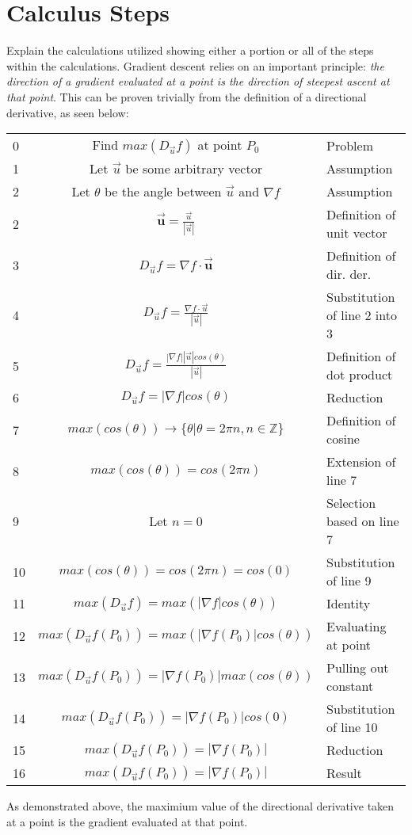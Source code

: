 \documentclass[11pt, a4paper]{article}
\newcommand\fvec[1]{\vec{\textbf{#1}}}
\begin{document}
\section{Calculus Steps}
Explain the calculations utilized showing either a portion or all of the steps within the calculations.
Gradient descent relies on an important principle: \textit{the direction of a gradient evaluated at a 
point is the direction of steepest ascent at that point}. This can be proven trivially from the definition
of a directional derivative, as seen below:
\begin{center}
    \begin{tabular}{l | c | l}
        0 & Find $max(D_{\vec{u}}f)$ at point $P_0$ & Problem\\
        1 & Let $\vec{u}$ be some arbitrary vector & Assumption\\
        2 & Let $\theta$ be the angle between $\vec{u}$ and $\nabla f$ & Assumption \\
        2 & $\fvec{u} = \frac{\vec{u}}{|\vec{u}|}$ & Definition of unit vector\\
        3 & $D_{\vec{u}}f = \nabla f \cdot \fvec{u}$ & Definition of dir. der.\\
        4 & $D_{\vec{u}}f = \frac{\nabla f \cdot \vec{u}}{|\vec{u}|}$ & Substitution of line 2 into 3 \\
        5 & $D_{\vec{u}}f = \frac{|\nabla f| |\vec{u}| cos(\theta)}{|\vec{u}|}$ & Definition of dot product \\
        6 & $D_{\vec{u}}f = |\nabla f| cos(\theta)$ & Reduction \\
        7 & $max(cos(\theta)) \rightarrow \{\theta | \theta = 2\pi n, n \in \mathbb{Z}\}$ & Definition of cosine \\
        8 & $max(cos(\theta)) = cos(2\pi n)$ & Extension of line 7 \\
        9 & Let $n = 0$ & Selection based on line 7 \\
        10 & $max(cos(\theta)) = cos(2 \pi n) = cos(0)$ & Substitution of line 9 \\
        11 & $max(D_{\vec{u}}f) = max(|\nabla f| cos(\theta))$ & Identity \\
        12 & $max(D_{\vec{u}}f(P_0)) = max(|\nabla f(P_0)| cos(\theta))$ & Evaluating at point \\
        13 & $max(D_{\vec{u}}f(P_0)) = |\nabla f(P_0)| max(cos(\theta))$ & Pulling out constant \\
        14 & $max(D_{\vec{u}}f(P_0)) = |\nabla f(P_0)| cos(0)$ & Substitution of line 10\\
        15 & $max(D_{\vec{u}}f(P_0)) = |\nabla f(P_0)|$ & Reduction \\
        16 & $max(D_{\vec{u}}f(P_0)) = |\nabla f(P_0)|$ & Result
    \end{tabular}
\end{center}
As demonstrated above, the maximium value of the directional derivative taken at a point is the gradient evaluated at that point.
\end{document}
